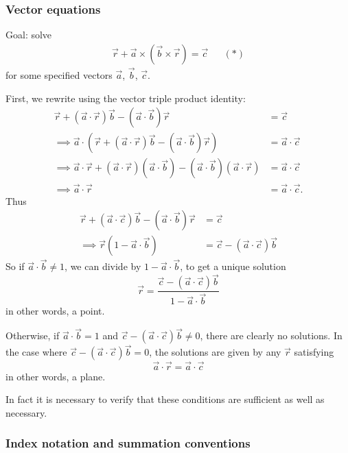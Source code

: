 \documentclass{../../template/note}
\begin{document}
    \subsubsection{Vector equations}

    Goal: solve
    \begin{align*}
        \vec r + \vec a \times (\vec b \times \vec r) = \vec c && (*)
    \end{align*}
    for some specified vectors \(\vec a\), \(\vec b\), \(\vec c\).

    First, we rewrite using the vector triple product identity:
    \begin{align*}
        \vec r + (\vec a \cdot \vec r)\vec b - (\vec a \cdot \vec b) \vec r &= \vec c \\
        \implies \vec a \cdot \left(\vec r + (\vec a \cdot \vec r)\vec b - (\vec a \cdot \vec b) \vec r\right) &= \vec a \cdot \vec c \\
        \implies \vec a \cdot \vec r + (\vec a \cdot \vec r)(\vec a \cdot \vec b) - (\vec a \cdot \vec b)(\vec a \cdot \vec r) &= \vec a \cdot \vec c \\
        \implies \vec a \cdot \vec r &= \vec a \cdot \vec c.
    \end{align*}
    Thus
    \begin{align*}
        \vec r + (\vec a \cdot \vec c)\vec b - (\vec a \cdot \vec b) \vec r &= \vec c \\
        \implies \vec r (1 - \vec a \cdot \vec b) &= \vec c - (\vec a \cdot \vec c) \vec b
    \end{align*}
    So if \(\vec a \cdot \vec b \neq 1\), we can divide by \(1 - \vec a \cdot \vec b\), to get a unique solution
    \[
        \vec r = \frac{\vec c - (\vec a \cdot \vec c) \vec b}{1 - \vec a \cdot \vec b}
    \]
    in other words, a point.

    Otherwise, if \(\vec a \cdot \vec b = 1\) and \(\vec c - (\vec a \cdot \vec c)\vec b \neq 0\), there are clearly no solutions. In the case where \(\vec c - (\vec a \cdot \vec c)\vec b = 0\), the solutions are given by any \(\vec r\) satisfying
    \[
        \vec a \cdot \vec r = \vec a \cdot \vec c
    \]
    in other words, a plane. 

    In fact it is necessary to verify that these conditions are sufficient as well as necessary.

    \subsubsection{Index notation and summation conventions}
\end{document}
